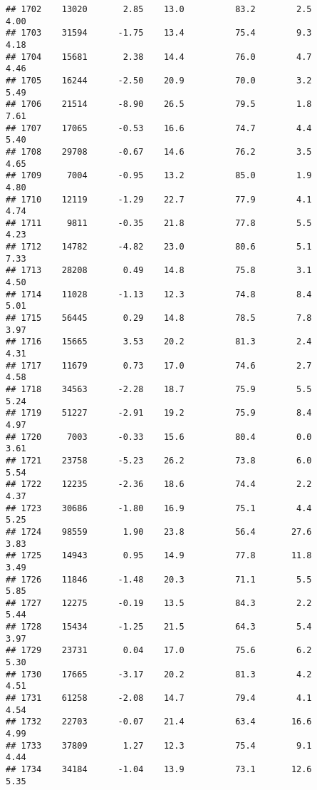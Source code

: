 \documentclass[
]{article}
\begin{document}
\begin{verbatim}
## 1702    13020       2.85    13.0          83.2        2.5              4.00
## 1703    31594      -1.75    13.4          75.4        9.3              4.18
## 1704    15681       2.38    14.4          76.0        4.7              4.46
## 1705    16244      -2.50    20.9          70.0        3.2              5.49
## 1706    21514      -8.90    26.5          79.5        1.8              7.61
## 1707    17065      -0.53    16.6          74.7        4.4              5.40
## 1708    29708      -0.67    14.6          76.2        3.5              4.65
## 1709     7004      -0.95    13.2          85.0        1.9              4.80
## 1710    12119      -1.29    22.7          77.9        4.1              4.74
## 1711     9811      -0.35    21.8          77.8        5.5              4.23
## 1712    14782      -4.82    23.0          80.6        5.1              7.33
## 1713    28208       0.49    14.8          75.8        3.1              4.50
## 1714    11028      -1.13    12.3          74.8        8.4              5.01
## 1715    56445       0.29    14.8          78.5        7.8              3.97
## 1716    15665       3.53    20.2          81.3        2.4              4.31
## 1717    11679       0.73    17.0          74.6        2.7              4.58
## 1718    34563      -2.28    18.7          75.9        5.5              5.24
## 1719    51227      -2.91    19.2          75.9        8.4              4.97
## 1720     7003      -0.33    15.6          80.4        0.0              3.61
## 1721    23758      -5.23    26.2          73.8        6.0              5.54
## 1722    12235      -2.36    18.6          74.4        2.2              4.37
## 1723    30686      -1.80    16.9          75.1        4.4              5.25
## 1724    98559       1.90    23.8          56.4       27.6              3.83
## 1725    14943       0.95    14.9          77.8       11.8              3.49
## 1726    11846      -1.48    20.3          71.1        5.5              5.85
## 1727    12275      -0.19    13.5          84.3        2.2              5.44
## 1728    15434      -1.25    21.5          64.3        5.4              3.97
## 1729    23731       0.04    17.0          75.6        6.2              5.30
## 1730    17665      -3.17    20.2          81.3        4.2              4.51
## 1731    61258      -2.08    14.7          79.4        4.1              4.54
## 1732    22703      -0.07    21.4          63.4       16.6              4.99
## 1733    37809       1.27    12.3          75.4        9.1              4.44
## 1734    34184      -1.04    13.9          73.1       12.6              5.35

\end{verbatim}
\end{document}
